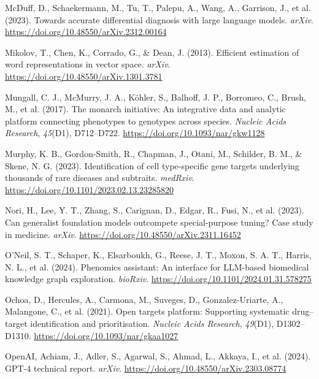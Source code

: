 \documentclass[
]{agujournal2019}
\newlength{\cslhangindent}
\newenvironment{CSLReferences}[2] %
 {\begin{list}{}{%
  \setlength{\itemindent}{0pt}
  \setlength{\leftmargin}{0pt}
  \setlength{\parsep}{0pt}
  \ifodd #1
   \setlength{\leftmargin}{\cslhangindent}
   \setlength{\itemindent}{-1\cslhangindent}
  \fi
  \setlength{\itemsep}{#2\baselineskip}}}
 {\end{list}}
\begin{document}
\begin{CSLReferences}{1}{0}
McDuff, D., Schaekermann, M., Tu, T., Palepu, A., Wang, A., Garrison,
J., et al. (2023). Towards accurate differential diagnosis with large
language models. \emph{arXiv}.
\url{https://doi.org/10.48550/arXiv.2312.00164}

Mikolov, T., Chen, K., Corrado, G., \& Dean, J. (2013). Efficient
estimation of word representations in vector space. \emph{arXiv}.
\url{https://doi.org/10.48550/arXiv.1301.3781}

Mungall, C. J., McMurry, J. A., Köhler, S., Balhoff, J. P., Borromeo,
C., Brush, M., et al. (2017). The monarch initiative: An integrative
data and analytic platform connecting phenotypes to genotypes across
species. \emph{Nucleic Acids Research}, \emph{45}(D1), D712--D722.
\url{https://doi.org/10.1093/nar/gkw1128}

Murphy, K. B., Gordon-Smith, R., Chapman, J., Otani, M., Schilder, B.
M., \& Skene, N. G. (2023). Identification of cell type-specific gene
targets underlying thousands of rare diseases and subtraits.
\emph{medRxiv}. \url{https://doi.org/10.1101/2023.02.13.23285820}

Nori, H., Lee, Y. T., Zhang, S., Carignan, D., Edgar, R., Fusi, N., et
al. (2023). Can generalist foundation models outcompete special-purpose
tuning? Case study in medicine. \emph{arXiv}.
\url{https://doi.org/10.48550/arXiv.2311.16452}

O'Neil, S. T., Schaper, K., Elsarboukh, G., Reese, J. T., Moxon, S. A.
T., Harris, N. L., et al. (2024). Phenomics assistant: An interface for
LLM-based biomedical knowledge graph exploration. \emph{bioRxiv}.
\url{https://doi.org/10.1101/2024.01.31.578275}

Ochoa, D., Hercules, A., Carmona, M., Suveges, D., Gonzalez-Uriarte, A.,
Malangone, C., et al. (2021). Open targets platform: Supporting
systematic drug--target identification and prioritisation. \emph{Nucleic
Acids Research}, \emph{49}(D1), D1302--D1310.
\url{https://doi.org/10.1093/nar/gkaa1027}

OpenAI, Achiam, J., Adler, S., Agarwal, S., Ahmad, L., Akkaya, I., et
al. (2024). GPT-4 technical report. \emph{arXiv}.
\url{https://doi.org/10.48550/arXiv.2303.08774}


\end{CSLReferences}
\end{document}
